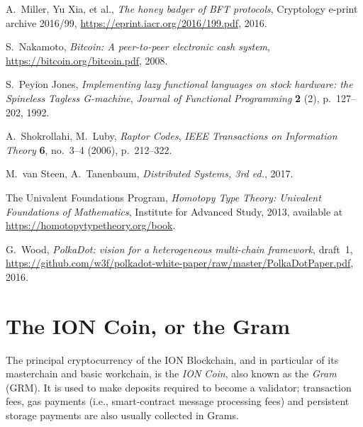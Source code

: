 \documentclass[12pt,oneside]{article}
\def\myappendix#1{\section{#1}\fancyhead[C]{\textsc{Appendix \textbf{\thesection.} #1}}}
\begin{document}
\begin{thebibliography}{2}
  {\sc A.~Miller, Yu Xia, et al.}, {\sl The honey badger of BFT protocols}, Cryptology e-print archive 2016/99, \url{https://eprint.iacr.org/2016/199.pdf}, 2016.

  {\sc S.~Nakamoto}, {\sl Bitcoin: A peer-to-peer electronic cash system}, \url{https://bitcoin.org/bitcoin.pdf}, 2008.

  {\sc S.~Peyion Jones}, {\sl Implementing lazy functional languages on stock hardware: the Spineless Tagless G-machine}, {\it Journal of Functional Programming\/} {\bf 2} (2), p.~127--202, 1992.

  {\sc A.~Shokrollahi, M.~Luby}, {\sl Raptor Codes}, {\it IEEE Transactions on Information Theory\/} {\bf 6}, no.\ 3--4 (2006), p.~212--322.

  {\sc M.~van Steen, A.~Tanenbaum}, {\sl Distributed Systems, 3rd ed.}, 2017.

  {\sc The Univalent Foundations Program}, {\sl Homotopy Type Theory: Univalent Foundations of Mathematics}, Institute for Advanced Study, 2013, available at \url{https://homotopytypetheory.org/book}.

  {\sc G.~Wood}, {\sl PolkaDot: vision for a heterogeneous multi-chain framework}, draft~1, \url{https://github.com/w3f/polkadot-white-paper/raw/master/PolkaDotPaper.pdf}, 2016.

\end{thebibliography}

%
%
%
%
\clearpage
\appendix
\myappendix{The ION Coin, or the Gram}\label{app:coins}

The principal cryptocurrency of the ION Blockchain, and in particular
of its masterchain and basic workchain, is the {\em ION Coin}, also
known as the {\em Gram\/} (GRM). It is used to make deposits required
to become a validator; transaction fees, gas payments (i.e.,
smart-contract message processing fees) and persistent storage
payments are also usually collected in Grams.
\end{document}
